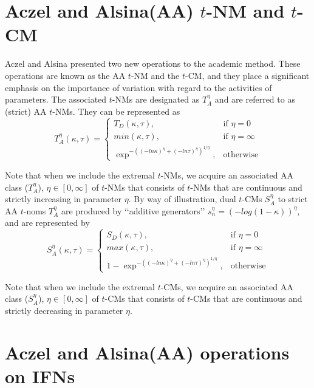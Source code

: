 \begin{flushleft}
\vspace{3mm}

\section{Aczel and Alsina(AA) $t$-NM and $t$-CM} 
Aczel and Alsina presented two new operations to the academic
method. These operations are known as the AA $t$-NM and the
$t$-CM, and they place a significant emphasis on the importance of
variation with regard to the activities of parameters.
The associated $t$-NMs are designated as $T_A ^\eta$
and are referred to as
(strict) AA $t$-NMs\cite{10}. They can be represented as
\begin{equation*}
    T_A^\eta (\kappa, \tau)= 
    \begin{cases}
    T_D (\kappa, \tau), & \text{if } \eta=0\\
    min (\kappa, \tau), & \text{if } \eta=\infty\\
    \exp^{-((-ln \kappa)^ \eta + (-ln \tau)^ \eta) ^{1/\eta}}, & \text{otherwise}
    \end{cases}
\end{equation*}

Note that when we include the extremal $t$-NMs, we acquire an associated
AA class ($ T_A^\eta$), $\eta \in [0, \infty]$ of $t$-NMs that consists of $t$-NMs that are
continuous and strictly increasing in parameter $\eta$.
By way of illustration, dual $t$-CMs $ S_A^\eta$
to strict AA $t$-noms $ T_A^\eta$
are
produced by ‘‘additive generators’’ $s_n^\eta=(-log(1-\kappa))^\eta$, and are
represented by
\begin{equation*}
    S_A^\eta (\kappa, \tau)= 
    \begin{cases}
    S_D (\kappa, \tau), & \text{if } \eta=0\\
    max (\kappa, \tau), & \text{if } \eta=\infty\\
    1-\exp^{-((-ln \kappa)^ \eta + (-ln \tau)^ \eta) ^{1/\eta}}, & \text{otherwise}
    \end{cases}
\end{equation*}

Note that when we include the extremal $t$-CMs, we acquire an associated
AA class ($ S_A^\eta$), $\eta \in [0, \infty]$ of $t$-CMs that consists of $t$-CMs that are
continuous and strictly decreasing in parameter $\eta$.


\section{Aczel and Alsina(AA) operations on IFNs}



\end{flushleft}
